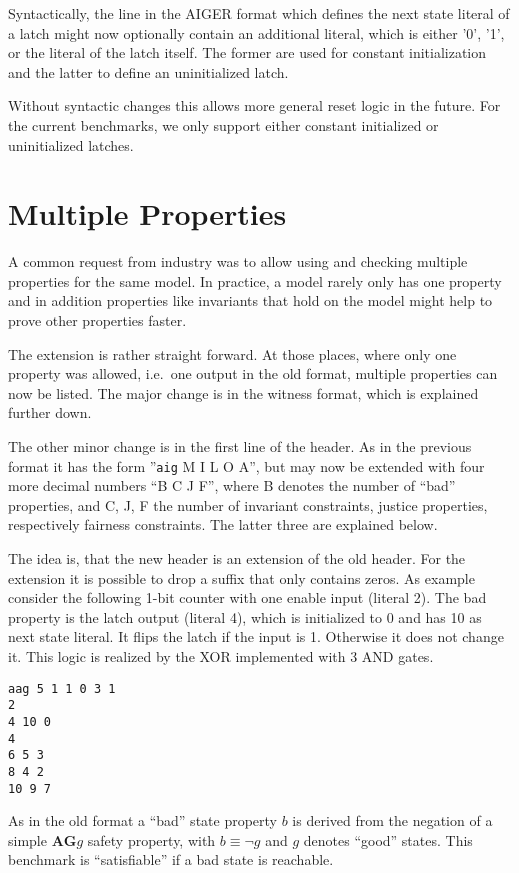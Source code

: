\documentclass{llncs}
\begin{document}
Syntactically, the line in the AIGER format which defines the next state
literal of a latch might now optionally contain an additional literal, which
is either '0', '1', or the literal of the latch itself.  The former are used
for constant initialization and the latter to define an uninitialized latch.

Without syntactic changes this allows more general reset logic in the
future.  For the current benchmarks, we only support either constant
initialized or uninitialized latches.

\section{Multiple Properties}

A common request from industry was to allow using and checking multiple
properties for the same model.  In practice, a model rarely only has one
property and in addition properties like invariants that hold on the model
might help to prove other properties faster.

The extension is rather straight forward.  At those places,
where only one property was allowed,
i.e.~one output in the old format, multiple properties can now be listed.
The major change is in the witness format, which is explained further down.

The other minor change is in the first line of the header.  As in the previous
format it has the form ''\texttt{aig} M I L O A'', but may now be
extended with four more decimal numbers ``B C J F'', where B denotes the
number of ``bad'' properties, and C, J, F the number of
invariant constraints, justice properties, respectively fairness
constraints.  The latter three are explained below.

The idea is, that the new header is an extension of the old header.
For the extension it is possible to drop a suffix that only contains
zeros.  As example consider the following 1-bit counter with one enable
input (literal 2).  The bad property is the latch output (literal 4), which
is initialized to 0 and has 10 as next state literal.  It flips the latch if
the input is 1.  Otherwise it does not change it.  This logic is realized by
the XOR implemented with 3 AND gates.
{\small
\begin{verbatim}
aag 5 1 1 0 3 1
2
4 10 0
4
6 5 3
8 4 2
10 9 7
\end{verbatim}}
As in the old format a ``bad'' state property $b$ is derived from the negation
of a simple $\mathrel{\mathbf{A}} \mathrel{\mathbf{G}} g$ safety property,
with $b \equiv \neg g$ and $g$ denotes ``good'' states.  This benchmark is
``satisfiable'' if a bad state is reachable.
\end{document}
